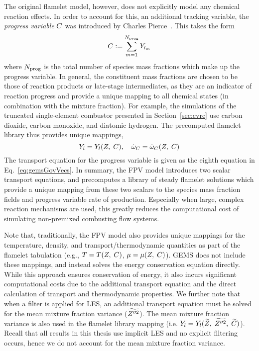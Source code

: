 The original flamelet model, however, does not explicitly model any chemical reaction effects. In order to account for this, an additional tracking variable, the \textit{progress variable} $C$ was introduced by Charles Pierce~\cite{Pierce2001}. This takes the form
%
\begin{equation}\label{eq:progVarDef}
	C := \sum_{m = 1}^{N_{\text{prog}}} Y_{l_{m}}
\end{equation}
%
where $N_{\text{prog}}$ is the total number of species mass fractions which make up the progress variable. In general, the constituent mass fractions are chosen to be those of reaction products or late-stage intermediates, as they are an indicator of reaction progress and provide a unique mapping to all chemical states (in combination with the mixture fraction). For example, the simulations of the truncated single-element combustor presented in Section~\ref{sec:cvrc} use carbon dioxide, carbon monoxide, and diatomic hydrogen. The precomputed flamelet library thus provides unique mappings,
%
\begin{equation}
	Y_{l} = Y_{l}(Z, \; C), \quad \dot{\omega}_{C} = \dot{\omega}_{C}(Z, \; C)
\end{equation}
%
The transport equation for the progress variable is given as the eighth equation in Eq.~\ref{eq:gemsGovVecs}. In summary, the FPV model introduces two scalar transport equations, and precomputes a library of steady flamelet solutions which provide a unique mapping from these two scalars to the species mass fraction fields and progress variable rate of production. Especially when large, complex reaction mechanisms are used, this greatly reduces the computational cost of simulating non-premixed combusting flow systems.

Note that, traditionally, the FPV model also provides unique mappings for the temperature, density, and transport/thermodynamic quantities as part of the flamelet tabulation (e.g., $T = T(Z, \; C)$, $\mu = \mu(Z, \; C)$). GEMS does not include these mappings, and instead solves the energy conservation equation directly. While this approach ensures conservation of energy, it also incurs significant computational costs due to the additional transport equation and the direct calculation of transport and thermodynamic properties. We further note that when a filter is applied for LES, an additional transport equation must be solved for the mean mixture fraction variance ($\widetilde{Z''^2}$). The mean mixture fraction variance is also used in the flamelet library mapping (i.e. $Y_{l} = Y_{l}(\widetilde{Z}, \; \widetilde{Z''^2}, \; \widetilde{C})$). Recall that all results in this thesis use implicit LES and no explicit filtering occurs, hence we do not account for the mean mixture fraction variance.